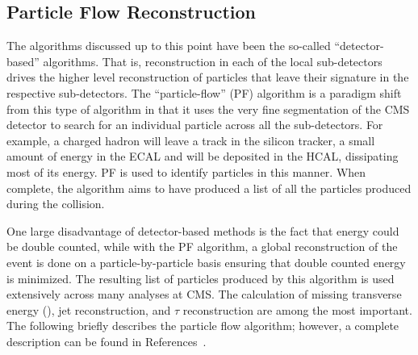 \subsection{Particle Flow Reconstruction}
\label {sec:cms_pf}
The algorithms discussed up to this point have been the so-called
``detector-based'' algorithms. That is, reconstruction in each of the local
sub-detectors drives the higher level reconstruction of particles that leave their
signature in the respective sub-detectors. The ``particle-flow'' (PF) algorithm
is a paradigm shift from this type of algorithm in that it uses the very fine
segmentation of the CMS detector to search for an individual particle across
all the sub-detectors. For example, a charged hadron will leave a track in the
silicon tracker, a small amount of energy in the ECAL and will be deposited in
the HCAL, dissipating most of its energy. PF is used to identify particles in
this manner. When complete, the algorithm aims to have produced a list of all
the particles produced during the collision.

One large disadvantage of detector-based methods is the fact that energy
could be double counted, while with the PF algorithm, a global reconstruction
of the event is done on a particle-by-particle basis ensuring that double
counted energy is minimized. The resulting list of particles produced
by this algorithm is used extensively across many analyses at CMS. The
calculation of missing transverse energy (\met), jet reconstruction, and $\tau$
reconstruction are among the most important. The following briefly describes
the particle flow algorithm; however, a complete description can be found in
References~\cite{pfReco,pfComm}.

